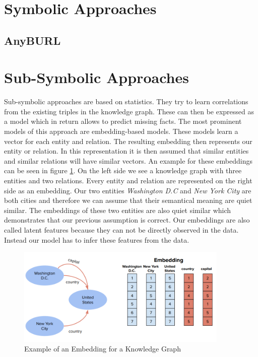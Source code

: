 \section{Symbolic Approaches}
\label{cha:symbolic_methods}

\subsection{AnyBURL}
\label{cha:anyburl}

\section{Sub-Symbolic Approaches}
\label{cha:sub_symbolic_methods}

Sub-symbolic approaches are based on statistics. They try to learn correlations from the existing triples in the knowledge graph. These can then be expressed as a model which in return allows to predict missing facts.  \cite{nickel_review_2016} The most prominent models of this approach are embedding-based models. These models learn a vector for each entity and relation. The resulting embedding then represents our entity or relation. In this representation it is then assumed that similar entities and similar relations will have similar vectors. An example for these embeddings can be seen in figure \ref{fig:embedding_example}. On the left side we see a knowledge graph with three entities and two relations. Every entity and relation are represented on the right side as an embedding. Our two entities \textit{Washington D.C} and \textit{New York City} are both cities and therefore we can assume that their semantical meaning are quiet similar. The embeddings of these two entities are also quiet similar which demonstrates that our previous assumption is correct. \cite{bianchi_knowledge_2021} Our embeddings are also called latent features because they can not be directly observed in the data. Instead our model has to infer these features from the data. \cite{nickel_review_2016} 

\begin{figure}[H]
\centering
\includegraphics[width=0.9\textwidth]{images/embedding_example.png}
\caption{Example of an Embedding for a Knowledge Graph}
\label{fig:embedding_example}
\end{figure}

